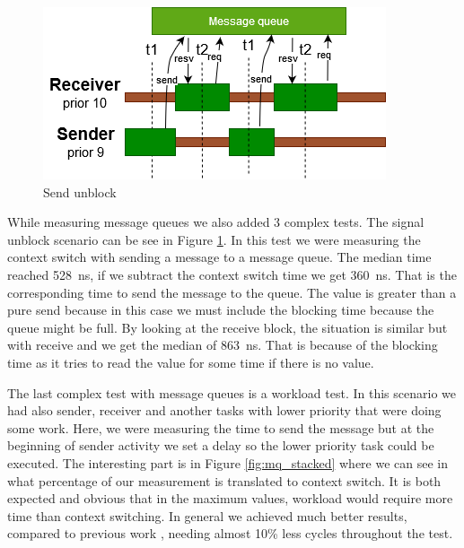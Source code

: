 \documentclass[conference]{IEEEtran}
\begin{document}
\begin{figure}[!htbp]
    \centerline{\includegraphics[width=0.7\columnwidth]{graphs/communication/signalblock.png}}
    \caption{Send unblock}
    \label{fig:signal_unblock}
    \vspace{-1.5em}
\end{figure}


While measuring message queues we also added 3 complex tests. The signal unblock scenario can be see in Figure \ref{fig:signal_unblock}. In this test we were measuring the context switch with sending a message to a message queue. The median time reached 528~ns, if we subtract the context switch time we get 360~ns. That is the corresponding time to send the message to the queue. The value is greater than a pure send because in this case we must include the blocking time because the queue might be full. By looking at the receive block, the situation is similar but with receive and we get the median of 863~ns. That is because of the blocking time as it tries to read the value for some time if there is no value.

The last complex test with message queues is a workload test. In this scenario we had also sender, receiver and another tasks with lower priority that were doing some work. Here, we were measuring the time to send the message but at the beginning of sender activity we set a delay so the lower priority task could be executed. The interesting part is in Figure \ref{fig:mq_stacked} where we can see in what percentage of our measurement is translated to context switch. It is both expected and obvious that in the maximum values, workload would require more time than context switching. In general we achieved much better results, compared to previous work \cite{b7, b5}, needing almost 10\% less cycles throughout the test.


\end{document}
